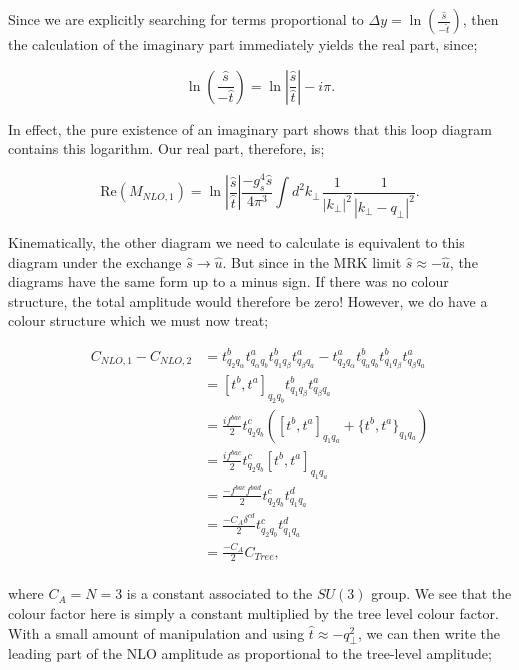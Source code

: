 Since we are explicitly searching for terms proportional to $\Delta y = \ln \left( \frac{\hat{s}}{-\hat{t}} \right)$, then the calculation of the imaginary part immediately yields the real part, since;

\begin{equation}
\ln \left( \frac{\hat{s}}{-\hat{t}} \right) = \ln \left| \frac{\hat{s}}{\hat{t}} \right| - i \pi.
\end{equation}

In effect, the pure existence of an imaginary part shows that this loop diagram contains this logarithm. Our real part, therefore, is;

\begin{equation}
\text{Re}(M_{NLO,1}) = \ln \left| \frac{\hat{s}}{\hat{t}} \right| \frac{-g_s^4 \hat{s}}{ 4 \pi^3} \int d^2 k_\perp \hspace{1pt}  \frac{1}{|k_\perp|^2} \frac{1}{|k_\perp - q_\perp|^2}.
\end{equation}

Kinematically, the other diagram we need to calculate is equivalent to this diagram under the exchange $\hat{s} \to \hat{u}$. But since in the MRK limit $\hat{s} \approx -\hat{u}$, the diagrams have the same form up to a minus sign. If there was no colour structure, the total amplitude would therefore be zero! However, we do have a colour structure which we must now treat;

\begin{equation}
\begin{split}
C_{NLO,1} - C_{NLO,2} &= t^b_{q_2 q_\alpha}t^a_{q_\alpha q_b} t^b_{q_1 q_\beta} t^a_{q_\beta q_a} -  t^a_{q_2 q_\alpha}t^b_{q_\alpha q_b} t^b_{q_1 q_\beta} t^a_{q_\beta q_a}\\
& = [t^b, t^a]_{q_2 q_b} t^b_{q_1 q_\beta} t^a_{q_\beta q_a} \\
&=\frac{if^{bac}}{2}t^c_{q_2 q_b} \left([t^b,t^a]_{q_1 q_a} + \{t^b,t^a\}_{q_1 q_a} \right) \\
&= \frac{if^{bac}}{2}t^c_{q_2 q_b} [t^b,t^a]_{q_1 q_a} \\
&= \frac{-f^{bac}f^{bad}}{2}t^c_{q_2 q_b} t^d_{q_1 q_a} \\
&= \frac{-C_A \delta^{cd}}{2}t^c_{q_2 q_b} t^d_{q_1 q_a} \\
&= \frac{-C_A}{2}C_{Tree}, \\
\end{split}
\end{equation}

where $C_A = N = 3$ is a constant associated to the $SU(3)$ group. We see that the colour factor here is simply a constant multiplied by the tree level colour factor. With a small amount of manipulation and using $\hat{t} \approx -q_\perp^2$, we can then write the leading part of the NLO amplitude as proportional to the tree-level amplitude;

